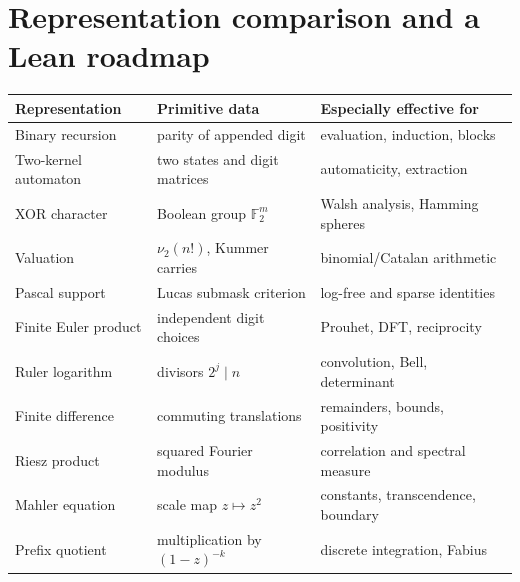 \documentclass[11pt,oneside]{article}
\numberwithin{equation}{section}
\theoremstyle{definition}
\theoremstyle{remark}
\newcommand{\F}{\mathbb F}
\newcommand{\vtwo}{\nu_2}
\begin{document}
\section{Representation comparison and a Lean roadmap}
\label{sec:formalization}

\begin{longtable}{@{}p{}p{}p{}@{}}
\toprule
Representation & Primitive data & Especially effective for \\
\midrule
\endhead
Binary recursion & parity of appended digit & evaluation, induction, blocks \\
Two-kernel automaton & two states and digit matrices & automaticity, extraction \\
XOR character & Boolean group \(\F_2^m\) & Walsh analysis, Hamming spheres \\
Valuation & \(\vtwo(n!)\), Kummer carries & binomial/Catalan arithmetic \\
Pascal support & Lucas submask criterion & log-free and sparse identities \\
Finite Euler product & independent digit choices & Prouhet, DFT, reciprocity \\
Ruler logarithm & divisors \(2^j\mid n\) & convolution, Bell, determinant \\
Finite difference & commuting translations & remainders, bounds, positivity \\
Riesz product & squared Fourier modulus & correlation and spectral measure \\
Mahler equation & scale map \(z\mapsto z^2\) & constants, transcendence, boundary \\
Prefix quotient & multiplication by \((1-z)^{-k}\) & discrete integration, Fabius \\
\bottomrule
\end{longtable}
\end{document}
